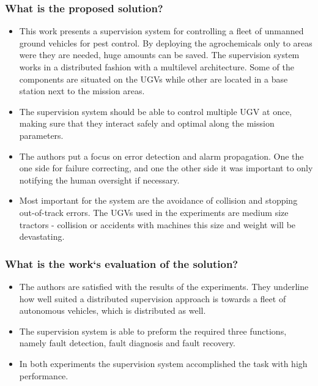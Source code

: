     \subsubsection*{What is the proposed solution?}
    \begin{itemize}
        \item  This work presents a supervision system for controlling a fleet of unmanned ground vehicles for pest control. By deploying the agrochemicals only to areas were they are needed, huge amounts can be saved. The supervision system works in a distributed fashion with a multilevel architecture. Some of the components are situated on the UGVs while other are located in a base station next to the mission areas.
        \item The supervision system should be able to control multiple UGV at once, making sure that they interact safely and optimal along the mission parameters.  
        \item The authors put a focus on error detection and alarm propagation. One the one side for failure correcting, and one the other side it was important to only notifying the human oversight if necessary. 
        \item Most important for the system are the avoidance of collision and stopping out-of-track errors. The UGVs used in the experiments are medium size tractors - collision or accidents with machines this size and weight will be devastating.
    \end{itemize}
    \subsubsection*{What is the work`s evaluation of the solution?}
    \begin{itemize}
        \item The authors are satisfied with the results of the experiments. They underline how well suited a distributed supervision approach is towards a fleet of autonomous vehicles, which is distributed as well.
        \item The supervision system is able to preform the required three functions, namely fault detection, fault diagnosis and fault recovery.
        \item In both experiments the supervision system accomplished the task with high performance.
    \end{itemize}
